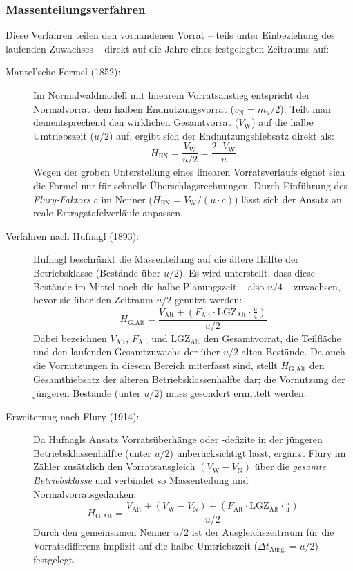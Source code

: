 \documentclass[twocolumn, paper=a4, fontsize=10pt]{scrartcl}
\begin{document}
\subsubsection{Massenteilungsverfahren}

Diese Verfahren teilen den vorhandenen Vorrat -- teils unter Einbeziehung des laufenden Zuwachses -- direkt auf die Jahre eines festgelegten Zeitraums auf:

\begin{description}
\item[Mantel'sche Formel (1852):] Im Normalwaldmodell mit linearem Vorratsanstieg entspricht der Normalvorrat dem halben Endnutzungsvorrat ($v_{\text{N}} = m_u / 2$). Teilt man dementsprechend den wirklichen Gesamtvorrat ($V_{\text{W}}$) auf die halbe Umtriebszeit ($u/2$) auf, ergibt sich der Endnutzungshiebsatz direkt als:
\begin{equation}
H_{\text{EN}} = \frac{V_{\text{W}}}{u / 2} = \frac{2 \cdot V_{\text{W}}}{u}
\end{equation}
Wegen der groben Unterstellung eines linearen Vorratsverlaufs eignet sich die Formel nur für schnelle Überschlagsrechnungen. Durch Einführung des \emph{Flury-Faktors} $c$ im Nenner ($H_{\text{EN}} = V_{\text{W}} / (u \cdot c)$) lässt sich der Ansatz an reale Ertragstafelverläufe anpassen.

\item[Verfahren nach Hufnagl (1893):] Hufnagl beschränkt die Massenteilung auf die ältere Hälfte der Betriebsklasse (Bestände über $u/2$). Es wird unterstellt, dass diese Bestände im Mittel noch die halbe Planungszeit -- also $u/4$ -- zuwachsen, bevor sie über den Zeitraum $u/2$ genutzt werden:
\begin{equation}
H_{\text{G,Alt}} = \frac{V_{\text{Alt}} + \left(F_{\text{Alt}} \cdot \text{LGZ}_{\text{Alt}} \cdot \frac{u}{4}\right)}{u / 2}
\end{equation}
Dabei bezeichnen $V_{\text{Alt}}$, $F_{\text{Alt}}$ und $\text{LGZ}_{\text{Alt}}$ den Gesamtvorrat, die Teilfläche und den laufenden Gesamtzuwachs der über $u/2$ alten Bestände. Da auch die Vornutzungen in diesem Bereich miterfasst sind, stellt $H_{\text{G,Alt}}$ den Gesamthiebsatz der älteren Betriebsklassenhälfte dar; die Vornutzung der jüngeren Bestände (unter $u/2$) muss gesondert ermittelt werden.

\item[Erweiterung nach Flury (1914):] Da Hufnagls Ansatz Vorratsüberhänge oder -defizite in der jüngeren Betriebsklassenhälfte (unter $u/2$) unberücksichtigt lässt, ergänzt Flury im Zähler zusätzlich den Vorratsausgleich $(V_{\text{W}} - V_{\text{N}})$ über die \emph{gesamte Betriebsklasse} und verbindet so Massenteilung und Normalvorratsgedanken:
\begin{equation}
H_{\text{G,Alt}} = \frac{V_{\text{Alt}} + (V_{\text{W}} - V_{\text{N}}) + \left(F_{\text{Alt}} \cdot \text{LGZ}_{\text{Alt}} \cdot \frac{u}{4}\right)}{u / 2}
\end{equation}
Durch den gemeinsamen Nenner $u/2$ ist der Ausgleichszeitraum für die Vorratsdifferenz implizit auf die halbe Umtriebszeit ($\Delta t_{\text{Ausgl}} = u/2$) festgelegt.
\end{description}
\end{document}
